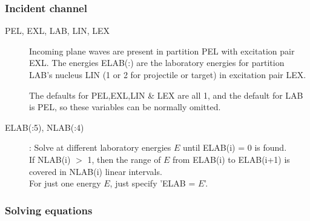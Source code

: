 \documentclass[11pt]{article}
\begin{document}
\subsubsection{Incident channel}
\begin{description}
\item[PEL, EXL, LAB, LIN, LEX]
Incoming plane waves are present in partition PEL with excitation
pair EXL.  The energies ELAB(:) are the laboratory energies for
partition LAB's nucleus LIN (1 or 2 for projectile or target)
in excitation pair LEX.

The defaults for PEL,EXL,LIN \& LEX are all 1, and the default
for LAB is PEL, so these variables can be normally omitted.

\item[ELAB(:5), NLAB(:4)] :
Solve at different laboratory energies $E$ until ELAB(i) = 0 is found.\\
 If NLAB(i) $>$ 1, then the range of $E$ from ELAB(i) to ELAB(i+1) is covered in NLAB(i) linear intervals.\\
 For just one energy $E$, just specify 'ELAB = $E$'.

\end{description}


\subsubsection{Solving equations}
\end{document}
